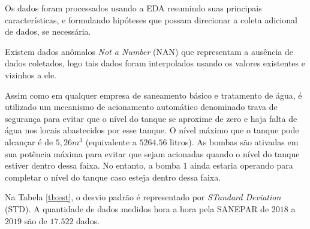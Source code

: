 Os dados foram processados usando a EDA resumindo suas principais características, e formulando hipóteses que possam direcionar a coleta adicional de dados, se necessária.

Existem dados anômalos \textit{Not a Number} (NAN) que representam a ausência de dados coletados, logo tais dados foram interpolados usando os valores existentes e vizinhos a ele.

Assim como em qualquer empresa de saneamento básico e tratamento de água, é utilizado um mecanismo de acionamento automático denominado trava de segurança para evitar que o nível do tanque se aproxime de zero e haja falta de água nos locais abastecidos por esse tanque. O nível máximo que o tanque pode alcançar é de $5,26 m^3$ (equivalente a $5264.56$ litros). As bombas são ativadas em sua potência máxima para evitar que sejam acionadas quando o nível do tanque estiver dentro dessa faixa. No entanto, a bomba $1$ ainda estaria operando para completar o nível do tanque caso esteja dentro dessa faixa.

Na Tabela \ref{tb:est}, o desvio padrão é representado por \textit{STandard Deviation} (STD). A quantidade de dados medidos hora a hora pela SANEPAR de $2018$ a $2019$ são de $17.522$ dados.

